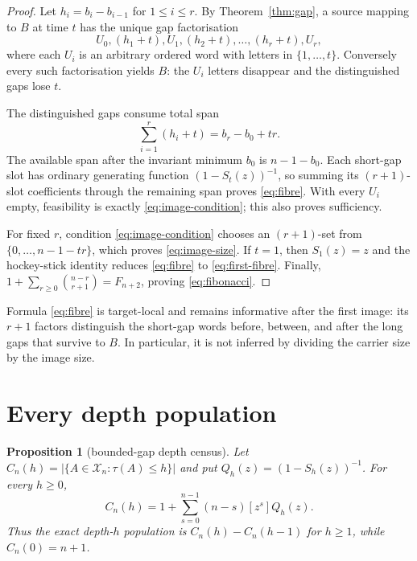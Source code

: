 \documentclass[a4paper,10pt]{amsart}
\newtheorem{proposition}[theorem]{Proposition}
\theoremstyle{remark}
\newcommand{\X}{\mathcal X}
\begin{document}
\begin{proof}
Let $h_i=b_i-b_{i-1}$ for $1\le i\le r$.  By
Theorem~\ref{thm:gap}, a source mapping to $B$ at time $t$ has the unique gap
factorisation
\begin{equation}\label{eq:factorization}
 U_0,(h_1+t),U_1,(h_2+t),\ldots,(h_r+t),U_r,
\end{equation}
where each $U_i$ is an arbitrary ordered word with letters in
$\{1,\ldots,t\}$.  Conversely every such factorisation yields $B$: the
$U_i$ letters disappear and the distinguished gaps lose $t$.

The distinguished gaps consume total span
\begin{equation*}
 \sum_{i=1}^r(h_i+t)=b_r-b_0+tr.
\end{equation*}
The available span after the invariant minimum $b_0$ is $n-1-b_0$.
Each short-gap slot has ordinary generating function
$(1-S_t(z))^{-1}$, so summing its $(r+1)$-slot coefficients through the
remaining span proves \eqref{eq:fibre}.  With every $U_i$ empty, feasibility
is exactly \eqref{eq:image-condition}; this also proves sufficiency.

For fixed $r$, condition \eqref{eq:image-condition} chooses an $(r+1)$-set
from $\{0,\ldots,n-1-tr\}$, which proves \eqref{eq:image-size}.  If $t=1$,
then $S_1(z)=z$ and the hockey-stick identity reduces \eqref{eq:fibre} to
\eqref{eq:first-fibre}.  Finally,
$1+\sum_{r\ge0}\binom{n-r}{r+1}=F_{n+2}$, proving
\eqref{eq:fibonacci}.
\end{proof}

Formula \eqref{eq:fibre} is target-local and remains informative after the
first image: its $r+1$ factors distinguish the short-gap words before,
between, and after the long gaps that survive to $B$.  In particular, it is
not inferred by dividing the carrier size by the image size.

\section{Every depth population}

\begin{proposition}[bounded-gap depth census]\label{prop:depth}
Let $C_n(h)=|\{A\in\X_n:\tau(A)\le h\}|$ and put
$Q_h(z)=(1-S_h(z))^{-1}$.  For every $h\ge0$,
\begin{equation}\label{eq:depth-cdf}
 C_n(h)=1+\sum_{s=0}^{n-1}(n-s)[z^s]Q_h(z).
\end{equation}
Thus the exact depth-$h$ population is $C_n(h)-C_n(h-1)$ for $h\ge1$,
while $C_n(0)=n+1$.
\end{proposition}
\end{document}
